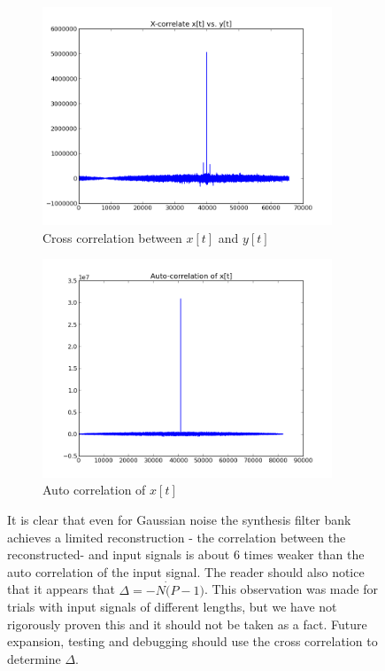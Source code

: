 \documentclass[a4paper,10pt]{article}
\begin{document}
\begin{figure}
 \begin{subfigure}{0.5\textwidth}
  \includegraphics[width=0.95\textwidth]{x_cor.png}
  \caption{Cross correlation between $x[t]$ and $y[t]$}
 \end{subfigure}
 \begin{subfigure}{0.5\textwidth}
  \includegraphics[width=0.95\textwidth]{auto_cor.png}
  \caption{Auto correlation of $x[t]$}
 \end{subfigure}
\caption{It is clear that even for Gaussian noise the synthesis filter bank achieves a limited reconstruction - the correlation between the reconstructed- and input signals is 
about 6 times weaker than the auto correlation of the input signal. The reader should also notice that it appears that $\Delta = -N\dot (P-1)$. This observation was made for 
trials with input signals of different lengths, but we have not rigorously proven this and it should not be taken as a fact. Future expansion, testing and debugging should use
the cross correlation to determine $\Delta$.}
\label{correlation}
\end{figure}
\end{document}
